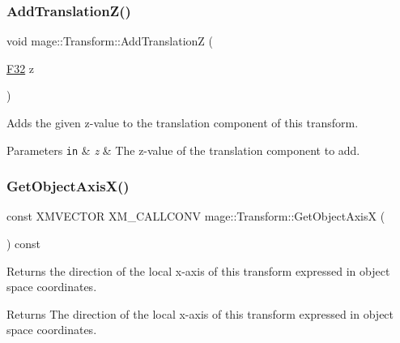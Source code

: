 \subsubsection{\texorpdfstring{Add\+Translation\+Z()}{AddTranslationZ()}}
{\footnotesize\ttfamily void mage\+::\+Transform\+::\+Add\+TranslationZ (\begin{DoxyParamCaption}\item[{\hyperlink{namespacemage_aa97e833b45f06d60a0a9c4fc22ae02c0}{F32}}]{z }\end{DoxyParamCaption})\hspace{0.3cm}{\ttfamily [noexcept]}}

Adds the given z-\/value to the translation component of this transform.


\begin{DoxyParams}[1]{Parameters}
\mbox{\tt in}  & {\em z} & The z-\/value of the translation component to add. \\
\hline
\end{DoxyParams}
\hypertarget{classmage_1_1_transform_a22ac692a1ff459dc85950e2810c34de9}{}\label{classmage_1_1_transform_a22ac692a1ff459dc85950e2810c34de9} 
\subsubsection{\texorpdfstring{Get\+Object\+Axis\+X()}{GetObjectAxisX()}}
{\footnotesize\ttfamily const X\+M\+V\+E\+C\+T\+OR X\+M\+\_\+\+C\+A\+L\+L\+C\+O\+NV mage\+::\+Transform\+::\+Get\+Object\+AxisX (\begin{DoxyParamCaption}{ }\end{DoxyParamCaption}) const\hspace{0.3cm}{\ttfamily [noexcept]}}

Returns the direction of the local x-\/axis of this transform expressed in object space coordinates.

\begin{DoxyReturn}{Returns}
The direction of the local x-\/axis of this transform expressed in object space coordinates. 
\end{DoxyReturn}
\hypertarget{classmage_1_1_transform_a11db94a3ba905405cccfd5f0e5ecf6d2}{}\label{classmage_1_1_transform_a11db94a3ba905405cccfd5f0e5ecf6d2} 
